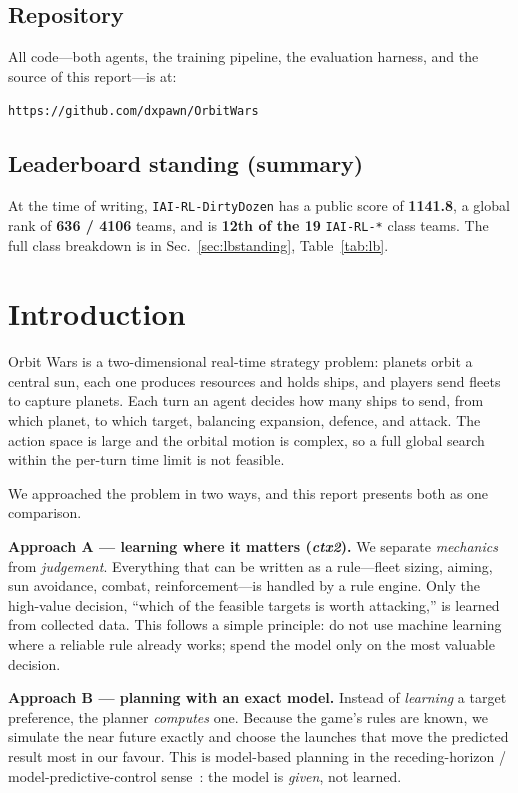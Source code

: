 \documentclass[conference]{IEEEtran}
\begin{document}
\subsection{Repository}
All code---both agents, the training pipeline, the evaluation harness, and the source of this report---is at:
\begin{center}
\texttt{https://github.com/dxpawn/OrbitWars}
\end{center}

\subsection{Leaderboard standing (summary)}
At the time of writing, \texttt{IAI-RL-DirtyDozen} has a public score of \textbf{1141.8}, a global rank of \textbf{636 / 4106} teams, and is \textbf{12th of the 19} \texttt{IAI-RL-*} class teams. The full class breakdown is in Sec.~\ref{sec:lbstanding}, Table~\ref{tab:lb}.

\section{Introduction}

Orbit Wars is a two-dimensional real-time strategy problem: planets orbit a central sun, each one produces resources and holds ships, and players send fleets to capture planets. Each turn an agent decides how many ships to send, from which planet, to which target, balancing expansion, defence, and attack. The action space is large and the orbital motion is complex, so a full global search within the per-turn time limit is not feasible.

We approached the problem in two ways, and this report presents both as one comparison.

\textbf{Approach A --- learning where it matters (\textit{ctx2}).} We separate \emph{mechanics} from \emph{judgement}. Everything that can be written as a rule---fleet sizing, aiming, sun avoidance, combat, reinforcement---is handled by a rule engine. Only the high-value decision, ``which of the feasible targets is worth attacking,'' is learned from collected data. This follows a simple principle: do not use machine learning where a reliable rule already works; spend the model only on the most valuable decision.

\textbf{Approach B --- planning with an exact model.} Instead of \emph{learning} a target preference, the planner \emph{computes} one. Because the game's rules are known, we simulate the near future exactly and choose the launches that move the predicted result most in our favour. This is model-based planning in the receding-horizon / model-predictive-control sense~\cite{mpc1989, suttonbarto}: the model is \emph{given}, not learned.
\end{document}
